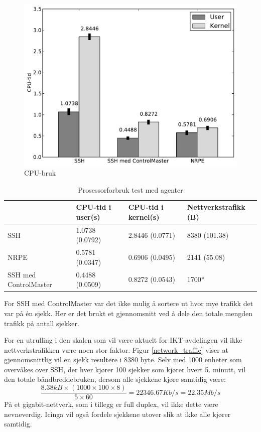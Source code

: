 \begin{figure}[H]
    \centering
    \includegraphics[scale=0.6]{img/cpubruk}
    \caption{CPU-bruk}
    \label{cpu_usage}
\end{figure}

\begin{table}
    \begin{center}
	\begin{threeparttable}
    \begin{tabular}{| l | l | l | l |} \hline
	\ & \textbf{CPU-tid i user(s)} & \textbf{CPU-tid i kernel(s)} & \textbf{Nettverkstrafikk (B)} \\ \hline
	SSH & 1.0738 (0.0792) & 2.8446 (0.0771) & 8380 (101.38) \\ \hline
	NRPE & 0.5781 (0.0347) & 0.6906 (0.0495) & 2141 (55.08) \\ \hline
	SSH med ControlMaster & 0.4488 (0.0509) & 0.8272 (0.0543) & 1700* \\ \hline
	\end{tabular}
	\begin{tablenotes}
	\small
	\item *For SSH med ControlMaster var det ikke mulig å sortere ut hvor mye trafikk det var på én sjekk. Her er det brukt et gjennomsnitt ved å dele den totale mengden trafikk på antall sjekker.
	\end{tablenotes}
	\caption{Prosessorforbruk test med agenter}
	\label{agentcheck}
	\end{threeparttable}
	\end{center}
\end{table}
For en utrulling i den skalen som vil være aktuelt for IKT-avdelingen vil ikke nettverkstrafikken være noen stor faktor. Figur \ref{network_traffic} viser at gjennomsnittlig vil en sjekk resultere i 8380 byte. Selv med 1000 enheter som overvåkes over SSH, der hver kjører 100 sjekker som kjører hvert 5. minutt, vil den totale båndbreddebruken, dersom alle sjekkene kjøre samtidig være:
\begin{equation}
\frac{8.38kB\times(1000\times100\times8)}{5\times60}=22346.67Kb/s = 22.35Mb/s
\end{equation}
På et gigabit-nettverk, som i tillegg er full duplex, vil ikke dette være nevneverdig. Icinga vil også fordele sjekkene utover slik at ikke alle kjører samtidig.

